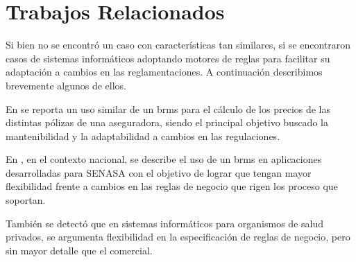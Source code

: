 \section{Trabajos Relacionados}\label{sec:trabajos_relacionados}

Si bien no se encontró un caso con características tan similares, si se encontraron casos de sistemas informáticos adoptando motores de reglas para facilitar su adaptación a cambios en las reglamentaciones. 
A continuación describimos brevemente algunos de ellos.

En \cite{medic2019calculation} se reporta un uso similar de un \acrshort{brms} \cite{proctor2012drools} para el cálculo de los precios de las distintas pólizas de una aseguradora, siendo el principal objetivo buscado la mantenibilidad y la adaptabilidad a cambios en las regulaciones.

En \cite{sampol2019sistema}, en el contexto nacional, se describe el uso de un \acrshort{brms} en aplicaciones desarrolladas para SENASA con el objetivo de lograr que tengan mayor flexibilidad frente a cambios en las reglas de negocio que rigen los proceso que soportan.

También se detectó que en sistemas informáticos para organismos de salud privados, se argumenta flexibilidad en la especificación de reglas de negocio, pero sin mayor detalle que el comercial.
